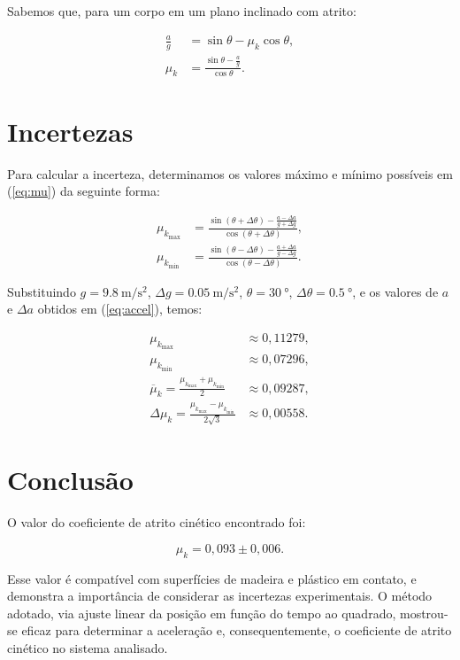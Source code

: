 \documentclass[10pt,twoside,twocolumn]{article} %
\begin{document}
Sabemos que, para um corpo em um plano inclinado com atrito:

\begin{align}\label{eq:mu}
	\frac{a}{g} &= \sin\theta - \mu_k \cos\theta, \nonumber \\
	\mu_k &= \frac{\sin\theta - \frac{a}{g}}{\cos\theta}.
\end{align}

\section{Incertezas}

Para calcular a incerteza, determinamos os valores máximo e mínimo possíveis em
(\ref{eq:mu}) da seguinte forma:

\begin{align*}
	\mu_{k_\text{max}} &= \frac{\sin(\theta + \Delta\theta) - \frac{a - \Delta a}{g + \Delta g}}{\cos(\theta + \Delta\theta)}, \\
	\mu_{k_\text{min}} &= \frac{\sin(\theta - \Delta\theta) - \frac{a + \Delta a}{g - \Delta g}}{\cos(\theta - \Delta\theta)}.
\end{align*}


Substituindo $g = \SI{9.8}{\meter\per\second\squared}$, $\Delta g =
\SI{0.05}{\meter\per\second\squared}$, $\theta = \SI{30}{\degree}$,
$\Delta\theta = \SI{0.5}{\degree}$, e os valores de $a$ e $\Delta a$ obtidos em
(\ref{eq:accel}), temos:

\begin{align*}
	\mu_{k_\text{max}} &\approx 0,11279, \\
	\mu_{k_\text{min}} &\approx 0,07296, \\
	\overline\mu_k = \frac{\mu_{k_\text{max}} + \mu_{k_\text{min}}}{2} &\approx 0,09287, \\
	\Delta\mu_k = \frac{\mu_{k_\text{max}} - \mu_{k_\text{min}}}{2\sqrt{3}} &\approx 0,00558.
\end{align*}

\section{Conclusão}

O valor do coeficiente de atrito cinético encontrado foi:

\begin{equation*}
	\mu_k = 0,093 \pm 0,006.
\end{equation*}

Esse valor é compatível com superfícies de madeira e plástico em contato, e
demonstra a importância de considerar as incertezas experimentais. O método
adotado, via ajuste linear da posição em função do tempo ao quadrado,
mostrou-se eficaz para determinar a aceleração e, consequentemente, o
coeficiente de atrito cinético no sistema analisado.
\end{document}
